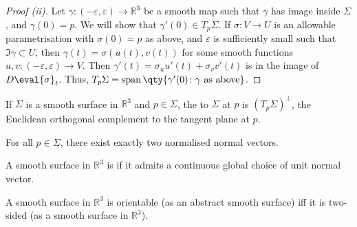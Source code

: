 \begin{proof}[Proof (ii)]
	Let $\gamma \colon (-\varepsilon, \varepsilon) \to \mathbb R^3$ be a smooth map such that $\gamma$ has image inside $\Sigma$, and $\gamma(0) = p$.
	We will show that $\gamma'(0) \in T_p \Sigma$.
	If $\sigma \colon V \to U$ is an allowable parametrisation with $\sigma(0) = p$ as above, and $\varepsilon$ is sufficiently small such that $\Im \gamma \subset U$, then $\gamma(t) = \sigma(u(t), v(t))$ for some smooth functions $u, v \colon (-\varepsilon, \varepsilon) \to V$.
	Then $\gamma'(t) = \sigma_u u'(t) + \sigma_v v'(t)$ is in the image of $D \eval{\sigma}_t$.
	Thus, $T_p \Sigma = \vecspan \qty{ \gamma'(0) \colon \gamma \text{ as above} }$.
\end{proof}

\begin{definition}
	If $\Sigma$ is a smooth surface in $\mathbb R^3$ and $p \in \Sigma$, the  to $\Sigma$ at $p$ is $(T_p \Sigma)^\perp$, the Euclidean orthogonal complement to the tangent plane at $p$.
\end{definition}

\begin{remark}
	For all $p \in \Sigma$, there exist exactly two normalised normal vectors.
\end{remark}

\begin{definition}
	A smooth surface in $\mathbb R^3$ is  if it admits a continuous global choice of unit normal vector.
\end{definition}

\begin{lemma} \label{lem:1.10}
	A smooth surface in $\mathbb R^3$ is orientable (as an abstract smooth surface) iff it is two-sided (as a smooth surface in $\mathbb R^3$).
\end{lemma}

